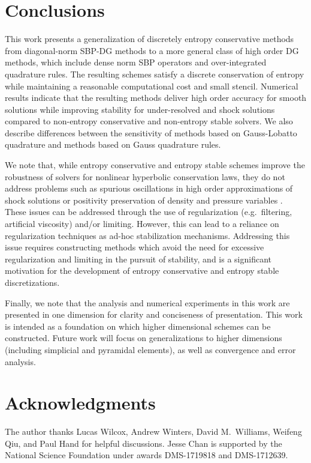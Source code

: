 \documentclass[preprint,10pt]{elsarticle}
\theoremstyle{definition}
\theoremstyle{lemma}
\theoremstyle{theorem}
\theoremstyle{assumption}
\begin{document}
\section{Conclusions}

This work presents a generalization of discretely entropy conservative methods from diagonal-norm SBP-DG methods to a more general class of high order DG methods, which include dense norm SBP operators and over-integrated quadrature rules.  The resulting schemes satisfy a discrete conservation of entropy while maintaining a reasonable computational cost and small stencil.  Numerical results indicate that the resulting methods deliver high order accuracy for smooth solutions while improving stability for under-resolved and shock solutions compared to non-entropy conservative and non-entropy stable solvers.  We also describe differences between the sensitivity of methods based on Gauss-Lobatto quadrature and methods based on Gauss quadrature rules.  

We note that, while entropy conservative and entropy stable schemes improve the robustness of solvers for nonlinear hyperbolic conservation laws, they do not address problems such as spurious oscillations in high order approximations of shock solutions or positivity preservation of density and pressure variables \cite{chen2017entropy}.  These issues can be addressed through the use of regularization (e.g.\ filtering, artificial viscosity) and/or limiting.  However, this can lead to a reliance on regularization techniques as ad-hoc stabilization mechanisms.  Addressing this issue requires constructing methods which avoid the need for excessive regularization and limiting in the pursuit of stability, and is a significant motivation for the development of entropy conservative and entropy stable discretizations.  

Finally, we note that the analysis and numerical experiments in this work are presented in one dimension for clarity and conciseness of presentation.  This work is intended as a foundation on which higher dimensional schemes can be constructed.  Future work will focus on generalizations to higher dimensions (including simplicial and pyramidal elements), as well as convergence and error analysis.  

\section{Acknowledgments}

The author thanks Lucas Wilcox, Andrew Winters, David M.\ Williams, Weifeng Qiu, and Paul Hand for helpful discussions.  Jesse Chan is supported by the National Science Foundation under awards DMS-1719818 and DMS-1712639.  
\end{document}
